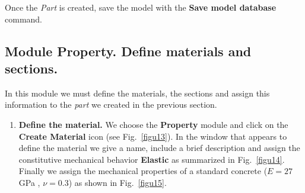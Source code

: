 Once the \textit{Part} is created, save the model with the
\textbf{Save model database} command.

\newpage
\subsection{Module Property. Define materials and sections.}

In this module we must define the materials, the sections and assign
this information to the \textit{part} we created in the previous
section.

\begin{enumerate}
\item \textbf{Define the material.} We choose the \textbf{Property}
  module and click on the \textbf{Create Material} icon (see
  Fig.~\ref{figu13}). In the window that appears to define the
  material we give a name, include a brief description and assign the
  constitutive mechanical behavior \textbf{Elastic} as summarized in
  Fig.~\ref{figu14}. Finally we assign the mechanical properties of a
  standard concrete ($ E = 27$ GPa , $ \nu = 0.3 $) as shown in
  Fig.~\ref{figu15}.


\end{enumerate}
